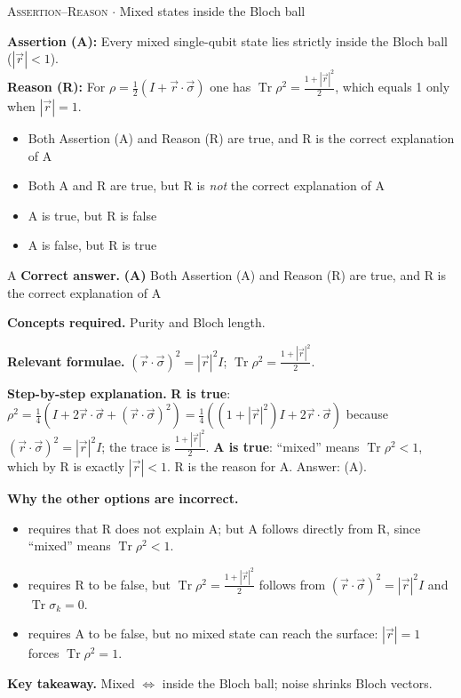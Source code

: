 \documentclass[11pt,a4paper]{article}
\newcommand{\optlabel}[1]{\textbf{(#1)}}
\newcommand{\correctlabel}[1]{\textcolor{okgreen}{\textbf{(#1)}\,\ding{51}}}
\newenvironment{qitem}[1]{\begin{list}{}{\setlength{\leftmargin}{3.3em}\setlength{\labelwidth}{3.1em}%
  \setlength{\labelsep}{0.2em}\setlength{\topsep}{3pt}\setlength{\parsep}{3pt}}\item[\textbf{Q.#1}\hfill]}{\end{list}}
\newcommand{\qsep}{\par\vspace{2pt}{\color{black!15}\hrule}\vspace{4pt}}
\newcommand{\qmeta}[2]{{\footnotesize\color{black!60}\textsc{#1} \;$\cdot$\; #2}\par}
\begin{document}
\begin{qitem}{17}
\qmeta{Assertion--Reason}{Mixed states inside the Bloch ball}
\textbf{Assertion (A):} Every mixed single-qubit state lies strictly inside the Bloch ball ($|\vec r| < 1$).\\[1mm]
\textbf{Reason (R):} For $\rho = \frac12(I + \vec r\cdot\vec\sigma)$ one has $\operatorname{Tr}\rho^2 = \frac{1 + |\vec r|^2}{2}$, which equals 1 only when $|\vec r| = 1$.
\begin{itemize}[leftmargin=2.6em, labelsep=0.4em, itemsep=2pt, topsep=3pt]
\item[\correctlabel{A}] Both Assertion (A) and Reason (R) are true, and R is the correct explanation of A
\item[\optlabel{B}] Both A and R are true, but R is \emph{not} the correct explanation of A
\item[\optlabel{C}] A is true, but R is false
\item[\optlabel{D}] A is false, but R is true
\end{itemize}
\end{qitem}
\begin{solbox}{A}
\textbf{\color{brand}Correct answer.} \textcolor{okgreen}{\textbf{(A)}} Both Assertion (A) and Reason (R) are true, and R is the correct explanation of A

\textbf{\color{brand}Concepts required.} Purity and Bloch length.

\textbf{\color{brand}Relevant formulae.} $(\vec r\cdot\vec\sigma)^2 = |\vec r|^2I$; $\operatorname{Tr}\rho^2 = \frac{1 + |\vec r|^2}{2}$.

\textbf{\color{brand}Step-by-step explanation.} \textbf{R is true}: $\rho^2 = \frac14(I + 2\vec r\cdot\vec\sigma + (\vec r\cdot\vec\sigma)^2) = \frac14((1 + |\vec r|^2)I + 2\vec r\cdot\vec\sigma)$ because
$(\vec r\cdot\vec\sigma)^2 = |\vec r|^2I$; the trace is $\frac{1 + |\vec r|^2}{2}$. \textbf{A is true}: ``mixed'' means $\operatorname{Tr}\rho^2 < 1$,
which by R is exactly $|\vec r| < 1$. R is the reason for A. Answer: (A).

\textbf{\color{brand}Why the other options are incorrect.}
\begin{itemize}[leftmargin=2.4em, itemsep=1pt, topsep=2pt]
\item[\textbf{(B)}] requires that R does not explain A; but A follows directly from R, since ``mixed'' means $\operatorname{Tr}\rho^2 < 1$.
\item[\textbf{(C)}] requires R to be false, but $\operatorname{Tr}\rho^2 = \frac{1 + |\vec r|^2}{2}$ follows from $(\vec r\cdot\vec\sigma)^2 = |\vec r|^2I$ and $\operatorname{Tr}\sigma_k = 0$.
\item[\textbf{(D)}] requires A to be false, but no mixed state can reach the surface: $|\vec r| = 1$ forces $\operatorname{Tr}\rho^2 = 1$.
\end{itemize}
\textbf{\color{brand}Key takeaway.} Mixed $\Leftrightarrow$ inside the Bloch ball; noise shrinks Bloch vectors.
\end{solbox}
\qsep
\end{document}
